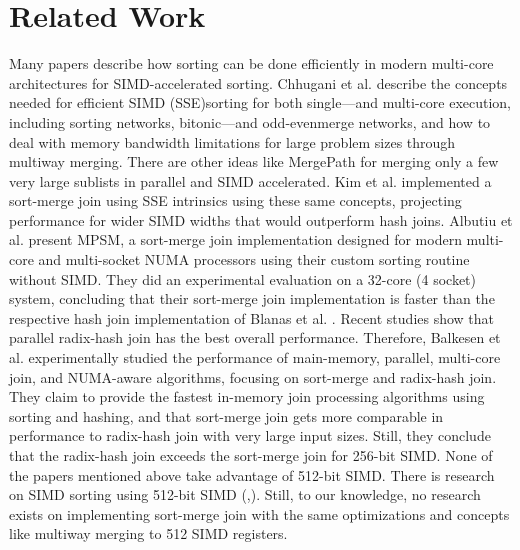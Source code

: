 \section{Related Work}
\label{sec:related-work}


Many papers describe how sorting can be done efficiently in modern multi-core architectures for
SIMD-accelerated sorting. Chhugani et al. \cite{10.14778/1454159.1454171} describe the concepts 
needed for efficient SIMD (SSE)sorting for both single—and multi-core execution, including sorting
networks, bitonic—and odd-evenmerge networks, and how to deal with memory bandwidth limitations 
for large problem sizes through multiway merging. There are other ideas like MergePath \cite{MergePath}
for merging only a few very large sublists in parallel and SIMD accelerated.
Kim et al. \cite{10.14778/1687553.1687564} implemented a sort-merge join using SSE intrinsics using these same 
concepts, projecting performance for wider SIMD widths that would outperform hash joins. Albutiu 
et al. \cite{MPSM} present MPSM, a sort-merge join implementation designed for modern multi-core and
multi-socket NUMA processors using their custom sorting routine without SIMD. They did an
experimental evaluation on a 32-core (4 socket) system, concluding that their sort-merge join
implementation is faster than the respective hash join implementation of Blanas et al. \cite{10.1145/1989323.1989328}. 
Recent studies show that parallel radix-hash join has the best overall performance. Therefore,
Balkesen et al. \cite{Balkesen} experimentally studied the performance of main-memory, parallel,
multi-core join, and NUMA-aware algorithms, focusing on sort-merge and radix-hash join.
They claim to provide the fastest in-memory join processing algorithms using sorting and hashing,
and that sort-merge join gets more comparable in performance to radix-hash join with very large 
input sizes. Still, they conclude that the radix-hash join exceeds the sort-merge join for 256-bit
SIMD. None of the papers mentioned above take advantage of 512-bit SIMD. There is research on SIMD
sorting using 512-bit SIMD (\cite{Watkins},\cite{8855628}). Still, to our knowledge, no research
exists on implementing sort-merge join with the same optimizations and concepts like
multiway merging to 512 SIMD registers.

\cite{MergePath} 
